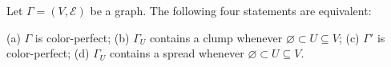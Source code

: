 Let $\Gamma = (V, \mathcal{E})$ be a graph. The following four statements are equivalent:

(a) $\Gamma$ is color-perfect;
(b) $\Gamma_U$ contains a clump whenever $\varnothing \subset U \subseteq V$;
(c) $\Gamma'$ is color-perfect;
(d) $\Gamma_U$ contains a spread whenever $\varnothing \subset U \subseteq V$.
